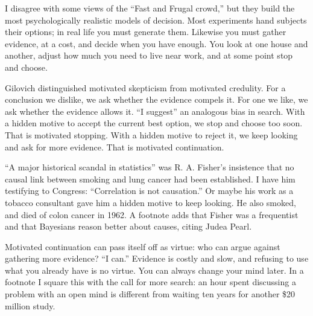 
I disagree with some views of the ``Fast and Frugal crowd,'' but they build the most psychologically realistic models of decision. Most experiments hand subjects their options; in real life you must generate them. Likewise you must gather evidence, at a cost, and decide when you have enough. You look at one house and another, adjust how much you need to live near work, and at some point stop and choose. 

Gilovich distinguished motivated skepticism from motivated credulity. For a conclusion we dislike, we ask whether the evidence compels it. For one we like, we ask whether the evidence allows it. ``I suggest'' an analogous bias in search. With a hidden motive to accept the current best option, we stop and choose too soon. That is motivated stopping. With a hidden motive to reject it, we keep looking and ask for more evidence. That is motivated continuation. 

``A major historical scandal in statistics'' was R. A. Fisher's insistence that no causal link between smoking and lung cancer had been established. I have him testifying to Congress: ``Correlation is not causation.''  Or maybe his work as a tobacco consultant gave him a hidden motive to keep looking. He also smoked, and died of colon cancer in 1962. A footnote adds that Fisher was a frequentist and that Bayesians reason better about causes, citing Judea Pearl. 

Motivated continuation can pass itself off as virtue: who can argue against gathering more evidence? ``I can.'' Evidence is costly and slow, and refusing to use what you already have is no virtue. You can always change your mind later. In a footnote I square this with the call for more search: an hour spent discussing a problem with an open mind is different from waiting ten years for another \$20 million study.

